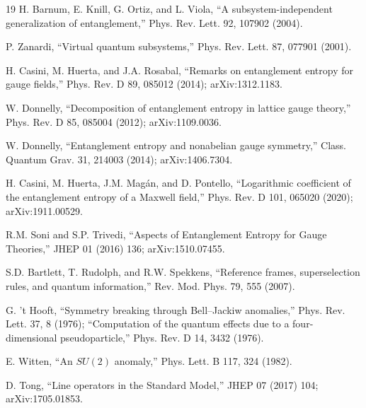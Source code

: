 \documentclass[11pt]{article}
\begin{document}
\begin{thebibliography}{19}
 H. Barnum, E. Knill, G. Ortiz, and L. Viola, ``A subsystem-independent generalization of entanglement,'' Phys. Rev. Lett. 92, 107902 (2004).

 P. Zanardi, ``Virtual quantum subsystems,'' Phys. Rev. Lett. 87, 077901 (2001).

 H. Casini, M. Huerta, and J.A. Rosabal, ``Remarks on entanglement entropy for gauge fields,'' Phys. Rev. D 89, 085012 (2014); arXiv:1312.1183.

 W. Donnelly, ``Decomposition of entanglement entropy in lattice gauge theory,'' Phys. Rev. D 85, 085004 (2012); arXiv:1109.0036.

 W. Donnelly, ``Entanglement entropy and nonabelian gauge symmetry,'' Class. Quantum Grav. 31, 214003 (2014); arXiv:1406.7304.

 H. Casini, M. Huerta, J.M. Mag\'an, and D. Pontello, ``Logarithmic coefficient of the entanglement entropy of a Maxwell field,'' Phys. Rev. D 101, 065020 (2020); arXiv:1911.00529.

 R.M. Soni and S.P. Trivedi, ``Aspects of Entanglement Entropy for Gauge Theories,'' JHEP 01 (2016) 136; arXiv:1510.07455.

 S.D. Bartlett, T. Rudolph, and R.W. Spekkens, ``Reference frames, superselection rules, and quantum information,'' Rev. Mod. Phys. 79, 555 (2007).

 G. 't Hooft, ``Symmetry breaking through Bell--Jackiw anomalies,'' Phys. Rev. Lett. 37, 8 (1976); ``Computation of the quantum effects due to a four-dimensional pseudoparticle,'' Phys. Rev. D 14, 3432 (1976).

 E. Witten, ``An $SU(2)$ anomaly,'' Phys. Lett. B 117, 324 (1982).

 D. Tong, ``Line operators in the Standard Model,'' JHEP 07 (2017) 104; arXiv:1705.01853.

\end{thebibliography}
\end{document}

